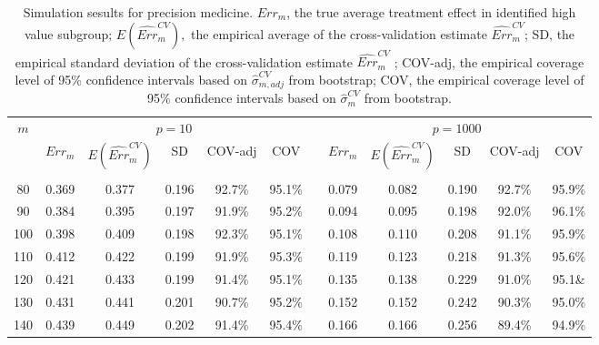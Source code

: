 \documentclass[12pt]{article}
\begin{document}
\begin{table}[ht]{
\centering
\setlength{\tabcolsep}{3pt}
\renewcommand{\arraystretch}{0.5}
\begin{tabular}{ c ccccc c ccccc }
\hline
$m$ & \multicolumn{5}{c}{$p = 10$} & & \multicolumn{5}{c}{$p = 1000$} \\
    & $Err_m$ & $E(\widehat{Err}_m^{CV})$ & SD   & COV-adj & COV & & $Err_m$ & $E(\hat{Err}_m^{CV})$ & SD   & COV-adj & COV \\
    \cline{2-6} \cline{8-12}\\
80  & 0.369 & 0.377 & 0.196 & 92.7\% & 95.1\% && 0.079 & 0.082 & 0.190& 92.7\% & 95.9\%\\
90  & 0.384 & 0.395 & 0.197 & 91.9\% & 95.2\% && 0.094 & 0.095 & 0.198& 92.0\% & 96.1\%\\
100 & 0.398 & 0.409 & 0.198 & 92.3\% & 95.1\% && 0.108 & 0.110 & 0.208& 91.1\% & 95.9\% \\
110 & 0.412 & 0.422 & 0.199 & 91.9\% & 95.3\% && 0.119 & 0.123 & 0.218& 91.3\% & 95.6\% \\
120 & 0.421 & 0.433 & 0.199 & 91.4\% & 95.1\% && 0.135 & 0.138 & 0.229& 91.0\% & 95.1\& \\
130 & 0.431 & 0.441 & 0.201 & 90.7\% & 95.2\% && 0.152 & 0.152 & 0.242& 90.3\% & 95.0\% \\
140 & 0.439 & 0.449 & 0.202 & 91.4\% & 95.4\% && 0.166 & 0.166 & 0.256& 89.4\% & 94.9\% \\
\end{tabular}
\caption{Simulation sesults for precision medicine. $Err_m$, the true average treatment effect in identified high value subgroup;  $E(\widehat{Err}_m^{CV}),$ the empirical average of the cross-validation estimate $\widehat{Err}_m^{CV}$; SD, the empirical standard deviation of the cross-validation estimate $\widehat{Err}_m^{CV}$  ; COV-adj, the empirical coverage level of 95\% confidence intervals based on $\hat{\sigma}_{m, adj}^{CV}$ from bootstrap; COV, the empirical coverage level of 95\% confidence intervals based on $\hat{\sigma}_{m}^{CV}$ from bootstrap.}\label{tab:simupm}}
\end{table}
\end{document}
